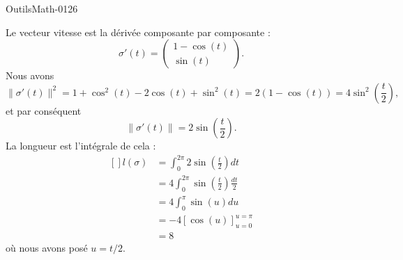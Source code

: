 
\begin{corrige}{OutilsMath-0126}

    Le vecteur vitesse est la dérivée composante par composante :
    \begin{equation}
        \sigma'(t)=\begin{pmatrix}
            1-\cos(t)    \\ 
            \sin(t)    
        \end{pmatrix}.
    \end{equation}
    Nous avons 
    \begin{equation}
        \| \sigma'(t) \|^2=1+\cos^2(t)-2\cos(t)+\sin^2(t)=2(1-\cos(t))=4\sin^2\left( \frac{ t }{2} \right),
    \end{equation}
    et par conséquent
    \begin{equation}
        \| \sigma'(t) \|=2\sin\left( \frac{ t }{2} \right).
    \end{equation}
    La longueur est l'intégrale de cela :
    \begin{equation}
        \begin{aligned}[]
            l(\sigma)&=\int_0^{2\pi}2\sin\left( \frac{ t }{2} \right)dt\\
            &=4\int_0^{2\pi}\sin\left( \frac{ t }{2} \right)\frac{ dt }{2}\\
            &=4\int_0^{\pi}\sin(u)du\\
            &=-4[\cos(u)]_{u=0}^{u=\pi}\\
            &=8
        \end{aligned}
    \end{equation}
    où nous avons posé \( u=t/2\).

\end{corrige}
